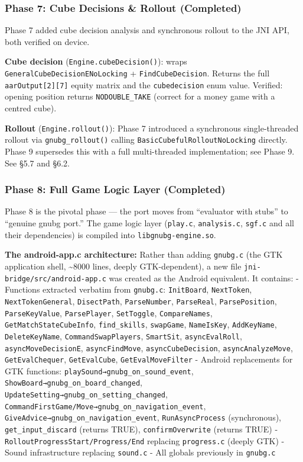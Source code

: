 \documentclass[11pt,a4paper]{article}
\begin{document}
\subsubsection{Phase 7: Cube Decisions \& Rollout
(Completed)}\label{phase-7-cube-decisions-rollout-completed}

Phase 7 added cube decision analysis and synchronous rollout to the JNI
API, both verified on device.

\textbf{Cube decision} (\texttt{Engine.cubeDecision()}): wraps
\texttt{GeneralCubeDecisionENoLocking} + \texttt{FindCubeDecision}.
Returns the full \texttt{aarOutput{[}2{]}{[}7{]}} equity matrix and the
\texttt{cubedecision} enum value. Verified: opening position returns
\texttt{NODOUBLE\_TAKE} (correct for a money game with a centred cube).

\textbf{Rollout} (\texttt{Engine.rollout()}): Phase 7 introduced a
synchronous single-threaded rollout via \texttt{gnubg\_rollout()}
calling \texttt{BasicCubefulRolloutNoLocking} directly. Phase 9
supersedes this with a full multi-threaded implementation; see Phase 9.
See §5.7 and §6.2.

\subsubsection{Phase 8: Full Game Logic Layer
(Completed)}\label{phase-8-full-game-logic-layer-completed}

Phase 8 is the pivotal phase --- the port moves from ``evaluator with
stubs'' to ``genuine gnubg port.'' The game logic layer
(\texttt{play.c}, \texttt{analysis.c}, \texttt{sgf.c} and all their
dependencies) is compiled into \texttt{libgnubg-engine.so}.

\textbf{The android-app.c architecture:} Rather than adding
\texttt{gnubg.c} (the GTK application shell, \textasciitilde8000 lines,
deeply GTK-dependent), a new file \texttt{jni-bridge/src/android-app.c}
was created as the Android equivalent. It contains: - Functions
extracted verbatim from \texttt{gnubg.c}: \texttt{InitBoard},
\texttt{NextToken}, \texttt{NextTokenGeneral}, \texttt{DisectPath},
\texttt{ParseNumber}, \texttt{ParseReal}, \texttt{ParsePosition},
\texttt{ParseKeyValue}, \texttt{ParsePlayer}, \texttt{SetToggle},
\texttt{CompareNames}, \texttt{GetMatchStateCubeInfo},
\texttt{find\_skills}, \texttt{swapGame}, \texttt{NameIsKey},
\texttt{AddKeyName}, \texttt{DeleteKeyName},
\texttt{CommandSwapPlayers}, \texttt{SmartSit}, \texttt{asyncEvalRoll},
\texttt{asyncMoveDecisionE}, \texttt{asyncFindMove},
\texttt{asyncCubeDecision}, \texttt{asyncAnalyzeMove},
\texttt{GetEvalChequer}, \texttt{GetEvalCube},
\texttt{GetEvalMoveFilter} - Android replacements for GTK functions:
\texttt{playSound→gnubg\_on\_sound\_event},
\texttt{ShowBoard→gnubg\_on\_board\_changed},
\texttt{UpdateSetting→gnubg\_on\_setting\_changed},
\texttt{CommandFirstGame/Move→gnubg\_on\_navigation\_event},
\texttt{GiveAdvice→gnubg\_on\_navigation\_event},
\texttt{RunAsyncProcess} (synchronous), \texttt{get\_input\_discard}
(returns TRUE), \texttt{confirmOverwrite} (returns TRUE) -
\texttt{RolloutProgressStart/Progress/End} replacing \texttt{progress.c}
(deeply GTK) - Sound infrastructure replacing \texttt{sound.c} - All
globals previously in \texttt{gnubg.c}
\end{document}
